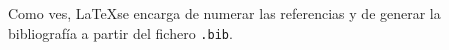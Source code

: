\documentclass[12pt,oneside,a4paper]{article}
\begin{document}
Como ves, \LaTeX se encarga de numerar las referencias y de generar la bibliografía a partir del fichero \verb$.bib$.






\end{document}
